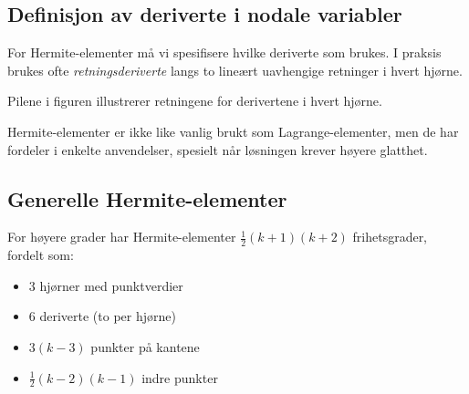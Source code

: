 \documentclass[../../main.tex]{subfiles}
\begin{document}
\subsection{Definisjon av deriverte i nodale variabler}

For Hermite-elementer må vi spesifisere hvilke deriverte som brukes. I praksis brukes ofte \emph{retningsderiverte} langs to lineært uavhengige retninger i hvert hjørne.

\begin{center}
    
\end{center}

Pilene i figuren illustrerer retningene for derivertene i hvert hjørne.

\begin{remark}{}{}
Hermite-elementer er ikke like vanlig brukt som Lagrange-elementer, men de har fordeler i enkelte anvendelser, spesielt når løsningen krever høyere glatthet.
\end{remark}

\subsection{Generelle Hermite-elementer}

For høyere grader har Hermite-elementer $\frac{1}{2}(k+1)(k+2)$ frihetsgrader, fordelt som:
\begin{itemize}
    \item 3 hjørner med punktverdier
    \item 6 deriverte (to per hjørne)
    \item $3(k-3)$ punkter på kantene
    \item $\frac{1}{2}(k-2)(k-1)$ indre punkter
\end{itemize}
\end{document}
